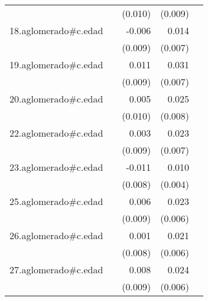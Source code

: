 {\begin{longtable}{l*{4}{D{.}{.}{-1}}}
            &                     &     (0.010)         &     (0.009)         &                     \\
\addlinespace
18.aglomerado#c.edad&                     &      -0.006         &       0.014\sym{*}  &                     \\
            &                     &     (0.009)         &     (0.007)         &                     \\
\addlinespace
19.aglomerado#c.edad&                     &       0.011         &       0.031\sym{***}&                     \\
            &                     &     (0.009)         &     (0.007)         &                     \\
\addlinespace
20.aglomerado#c.edad&                     &       0.005         &       0.025\sym{**} &                     \\
            &                     &     (0.010)         &     (0.008)         &                     \\
\addlinespace
22.aglomerado#c.edad&                     &       0.003         &       0.023\sym{***}&                     \\
            &                     &     (0.009)         &     (0.007)         &                     \\
\addlinespace
23.aglomerado#c.edad&                     &      -0.011         &       0.010\sym{*}  &                     \\
            &                     &     (0.008)         &     (0.004)         &                     \\
\addlinespace
25.aglomerado#c.edad&                     &       0.006         &       0.023\sym{***}&                     \\
            &                     &     (0.009)         &     (0.006)         &                     \\
\addlinespace
26.aglomerado#c.edad&                     &       0.001         &       0.021\sym{***}&                     \\
            &                     &     (0.008)         &     (0.006)         &                     \\
\addlinespace
27.aglomerado#c.edad&                     &       0.008         &       0.024\sym{***}&                     \\
            &                     &     (0.009)         &     (0.006)         &                     \\

\end{longtable}}
